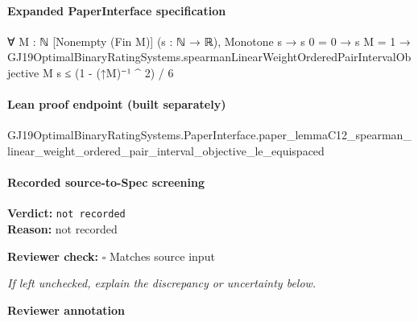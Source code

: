 \documentclass[10pt]{article}
\newcommand{\reviewerbox}{%
  \par\noindent\fbox{\parbox{0.96\linewidth}{\rule{0pt}{0.38in}}}\par
}
\newcommand{\reviewmatch}[1]{%
  \par\noindent\textbf{Reviewer check:} $\square$\; #1\par
  \noindent\emph{If left unchecked, explain the discrepancy or uncertainty below.}\par
}
\begin{document}
\paragraph{Expanded PaperInterface specification}
\begin{ReviewVerbatim}
∀ {M : ℕ} [Nonempty (Fin M)] (s : ℕ → ℝ),
  Monotone s →
    s 0 = 0 →
      s M = 1 →
        GJ19OptimalBinaryRatingSystems.spearmanLinearWeightOrderedPairIntervalObjective M s ≤ (1 - (↑M)⁻¹ ^ 2) / 6
\end{ReviewVerbatim}

\paragraph{Lean proof endpoint (built separately)}\begin{ReviewVerbatim}
GJ19OptimalBinaryRatingSystems.PaperInterface.paper_lemmaC12_spearman_linear_weight_ordered_pair_interval_objective_le_equispaced
\end{ReviewVerbatim}

\paragraph{Recorded source-to-Spec screening}
\textbf{Verdict:} \texttt{not recorded}
\\
\textbf{Reason:} not recorded
\reviewmatch{Matches source input}
\noindent\textbf{Reviewer annotation}\par
\reviewerbox
\end{document}
